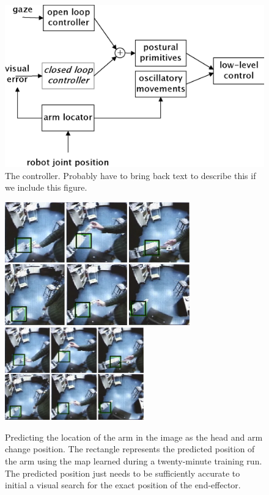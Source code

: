 \ifverbose
\begin{figure}[tbh]
\begin{center}
\includegraphics[width=\columnwidth]{control-flow.eps}
\caption{ 
\label{fig:control-flow}
%
  The controller.  Probably have to bring back text to describe this
  if we include this figure.
%
}
\end{center}
\end{figure}
\fi

\begin{figure}[tb]
\begin{center}
\ifrevised
\includegraphics[width=8.0cm]{predict-position.eps}
\else
\includegraphics[width=6.0cm]{predict-position.eps}
\fi
\caption{ 
\label{fig:predict-position}
%
Predicting the location of the arm in the image as the head and arm
change position. The rectangle represents the predicted position of
the arm using the map learned during a twenty-minute training run.
The predicted position just needs to be sufficiently accurate to
initial\ize{} a visual search for the exact position of the end-effector.
%
}
\end{center}
\end{figure}

